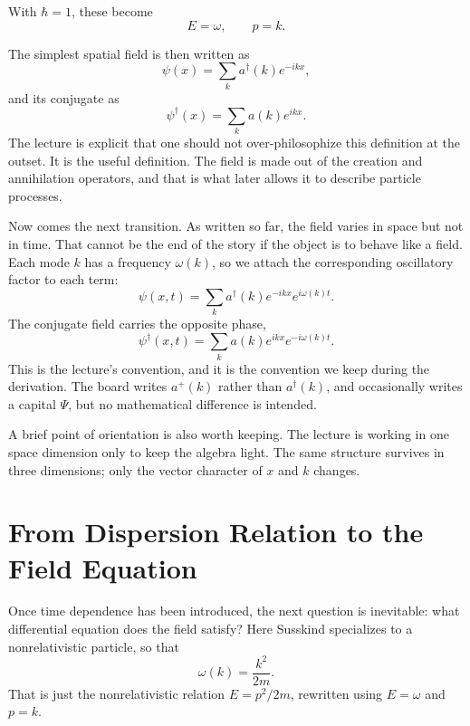 With \(\hbar=1\), these become
\begin{equation}
E=\omega,
\qquad
p=k.
\end{equation}

The simplest spatial field is then written as
\begin{equation}
\psi(x)=\sum_k a^\dagger(k)e^{-ikx},
\end{equation}
and its conjugate as
\begin{equation}
\psi^\dagger(x)=\sum_k a(k)e^{ikx}.
\end{equation}
The lecture is explicit that one should not over-philosophize this definition at the outset. It is the useful definition. The field is made out of the creation and annihilation operators, and that is what later allows it to describe particle processes.

Now comes the next transition. As written so far, the field varies in space but not in time. That cannot be the end of the story if the object is to behave like a field. Each mode \(k\) has a frequency \(\omega(k)\), so we attach the corresponding oscillatory factor to each term:
\begin{equation}
\psi(x,t)=\sum_k a^\dagger(k)e^{-ikx}e^{i\omega(k)t}.
\end{equation}
The conjugate field carries the opposite phase,
\begin{equation}
\psi^\dagger(x,t)=\sum_k a(k)e^{ikx}e^{-i\omega(k)t}.
\end{equation}
This is the lecture's convention, and it is the convention we keep during the derivation. The board writes \(a^+(k)\) rather than \(a^\dagger(k)\), and occasionally writes a capital \(\Psi\), but no mathematical difference is intended.

A brief point of orientation is also worth keeping. The lecture is working in one space dimension only to keep the algebra light. The same structure survives in three dimensions; only the vector character of \(x\) and \(k\) changes.

\section{From Dispersion Relation to the Field Equation}

Once time dependence has been introduced, the next question is inevitable: what differential equation does the field satisfy? Here Susskind specializes to a nonrelativistic particle, so that
\begin{equation}
\omega(k)=\frac{k^2}{2m}.
\end{equation}
That is just the nonrelativistic relation \(E=p^2/2m\), rewritten using \(E=\omega\) and \(p=k\).

